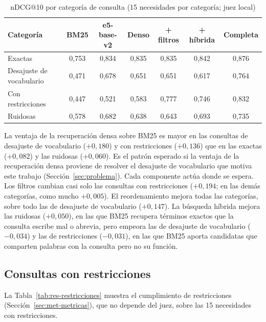 \begin{table}[htbp!]
    \centering
    \caption{nDCG@10 por categoría de consulta (15 necesidades por categoría; juez local)}
    \label{tab:res-pe1-categoria}
    \small
    \begin{tabular}{|l|c|c|c|c|c|c|}
        \hline
        \textbf{Categoría} & \textbf{BM25} & \textbf{e5-base-v2} & \textbf{Denso} & \textbf{+ filtros} & \textbf{+ híbrida} & \textbf{Completa} \\
        \hline
        Exactas & 0{,}753 & 0{,}834 & 0{,}835 & 0{,}835 & 0{,}842 & 0{,}876 \\
        \hline
        Desajuste de vocabulario & 0{,}471 & 0{,}678 & 0{,}651 & 0{,}651 & 0{,}617 & 0{,}764 \\
        \hline
        Con restricciones & 0{,}447 & 0{,}521 & 0{,}583 & 0{,}777 & 0{,}746 & 0{,}832 \\
        \hline
        Ruidosas & 0{,}578 & 0{,}682 & 0{,}638 & 0{,}643 & 0{,}693 & 0{,}735 \\
        \hline
    \end{tabular}
\end{table}

La ventaja de la recuperación densa sobre BM25 es mayor en las consultas de desajuste de vocabulario ($+0{,}180$) y con restricciones ($+0{,}136$) que en las exactas ($+0{,}082$) y las ruidosas ($+0{,}060$). Es el patrón esperado si la ventaja de la recuperación densa proviene de resolver el desajuste de vocabulario que motiva este trabajo (Sección~\ref{sec:problema}). Cada componente actúa donde se espera. Los filtros cambian casi solo las consultas con restricciones ($+0{,}194$; en las demás categorías, como mucho $+0{,}005$). El reordenamiento mejora todas las categorías, sobre todo las de desajuste de vocabulario ($+0{,}147$). La búsqueda híbrida mejora las ruidosas ($+0{,}050$), en las que BM25 recupera términos exactos que la consulta escribe mal o abrevia, pero empeora las de desajuste de vocabulario ($-0{,}034$) y las de restricciones ($-0{,}031$), en las que BM25 aporta candidatas que comparten palabras con la consulta pero no su función.

\subsection{Consultas con restricciones}

La Tabla~\ref{tab:res-restricciones} muestra el cumplimiento de restricciones (Sección~\ref{sec:met-metricas}), que no depende del juez, sobre las 15 necesidades con restricciones.

